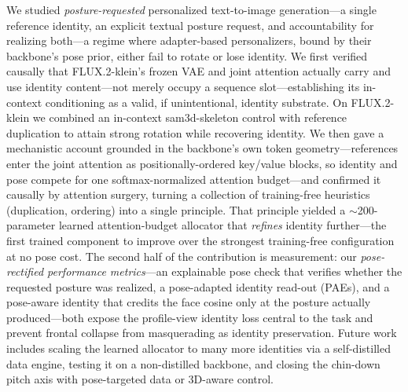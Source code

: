 \label{sec:conclusion}
We studied \emph{posture-requested} personalized text-to-image generation---a
single reference identity, an explicit textual posture request, and
accountability for realizing both---a regime where adapter-based personalizers,
bound by their backbone's pose prior, either fail to rotate or lose identity. We first verified causally that FLUX.2-klein's frozen VAE and joint attention
actually carry and use identity content---not merely occupy a sequence
slot---establishing its in-context conditioning as a valid, if unintentional,
identity substrate. On
FLUX.2-klein we combined an in-context sam3d-skeleton control with reference
duplication to attain strong rotation while recovering identity. We then gave a
mechanistic account grounded in the backbone's own token geometry---references
enter the joint attention as positionally-ordered key/value blocks, so identity
and pose compete for one softmax-normalized attention budget---and confirmed it
causally by attention surgery, turning a collection of training-free heuristics
(duplication, ordering) into a single principle. That principle yielded a
$\sim$200-parameter learned attention-budget allocator that \emph{refines}
identity further---the first trained component to improve over the strongest
training-free configuration at no pose cost. The second half of the contribution
is measurement: our \emph{pose-rectified performance metrics}---an explainable
pose check that verifies whether the requested posture was realized, a
pose-adapted identity read-out (PAEs), and a pose-aware identity that credits the
face cosine only at the posture actually produced---both expose the profile-view
identity loss central to the task and prevent frontal collapse from masquerading
as identity preservation. Future work includes scaling the learned allocator to
many more identities via a self-distilled data engine, testing it on a
non-distilled backbone, and closing the chin-down pitch axis with pose-targeted
data or 3D-aware control.
